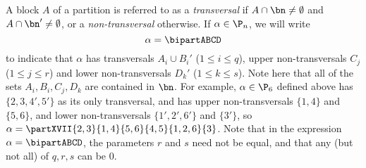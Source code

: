 
A block $A$ of a partition is referred to as a \emph{transversal} if
$A\cap\bn\not=\emptyset$ and $A\cap\bn'\not=\emptyset$, or a
\emph{non-transversal} otherwise.
%
If $\alpha\in\P_n$, we will write
\[
\alpha=\bipartABCD
\]
to indicate that $\alpha$ has transversals $A_i\cup B_i'$ ($1\leq i\leq q$), upper non-transversals $C_j$ ($1\leq j\leq r$) and lower non-transversals $D_k'$ ($1\leq k\leq s$).  Note here that all of the sets $A_i,B_i,C_j,D_k$ are contained in $\bn$.
%
For example, $\alpha\in\P_6$ defined above has $\{2,3,4',5'\}$ as its only
transversal, and has upper non-transversals $\{1,4\}$ and
$\{5,6\}$, and lower non-transversals $\{1',2',6'\}$ and $\{3'\}$,
so $\alpha = \partXVII{2,3}{1,4}{5,6}{4,5}{1,2,6}{3}$.
Note that in the expression $\alpha=\bipartABCD$, the parameters $r$ and $s$ need
not be equal, and that any (but not all) of $q,r,s$ can be $0$.


